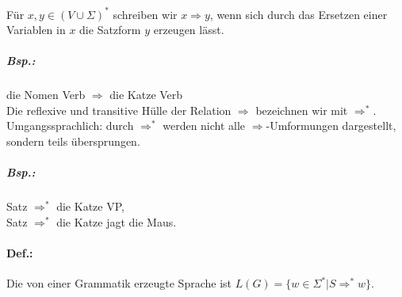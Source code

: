 Für $x,y\in (V \cup \Sigma)^*$ schreiben wir $x \Rightarrow y$, wenn sich durch das Ersetzen einer Variablen in $x$ die Satzform $y$ erzeugen lässt.
\subparagraph{Bsp.:} die Nomen Verb $\Rightarrow$ die Katze Verb\medskip\\
Die reflexive und transitive Hülle der Relation $\Rightarrow$ bezeichnen wir mit $\Rightarrow^*$. Umgangssprachlich: durch $\Rightarrow^*$ werden nicht alle $\Rightarrow$-Umformungen dargestellt, sondern teils übersprungen.
\subparagraph{Bsp.:} \parskp
Satz $\Rightarrow^*$ die Katze VP, \\
Satz $\Rightarrow^*$ die Katze jagt die Maus.
\paragraph{Def.:} Die von einer Grammatik erzeugte Sprache ist $L(G)=\{w\in \Sigma^* | S \Rightarrow^* w\}$.




\newpage
\printbibliography

